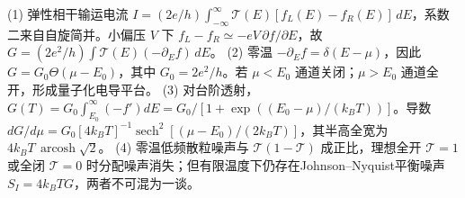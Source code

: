 (1) 弹性相干输运电流 \(I=(2e/h)\int_{-\infty}^{\infty}\mathcal T(E)[f_L(E)-f_R(E)]\,dE\)，系数二来自自旋简并。小偏压 \(V\) 下 \(f_L-f_R\simeq-eV\,\partial f/\partial E\)，故 \(G=(2e^2/h)\int\mathcal T(E)(-\partial_Ef)\,dE\)。
(2) 零温 \(-\partial_Ef=\delta(E-\mu)\)，因此 \(G=G_0\Theta(\mu-E_0)\)，其中 \(G_0=2e^2/h\)。若 \(\mu<E_0\) 通道关闭；\(\mu>E_0\) 通道全开，形成量子化电导平台。
(3) 对台阶透射，\(G(T)=G_0\int_{E_0}^\infty(-f')dE=G_0/[1+\exp((E_0-\mu)/(k_BT))]\)。导数 \(dG/d\mu=G_0[4k_BT]^{-1}\operatorname{sech}^2[(\mu-E_0)/(2k_BT)]\)，其半高全宽为 \(4k_BT\,\operatorname{arcosh}\sqrt2\)。
(4) 零温低频散粒噪声与 \(\mathcal T(1-\mathcal T)\) 成正比，理想全开 \(\mathcal T=1\) 或全闭 \(\mathcal T=0\) 时分配噪声消失；但有限温度下仍存在Johnson--Nyquist平衡噪声 \(S_I=4k_BT G\)，两者不可混为一谈。
